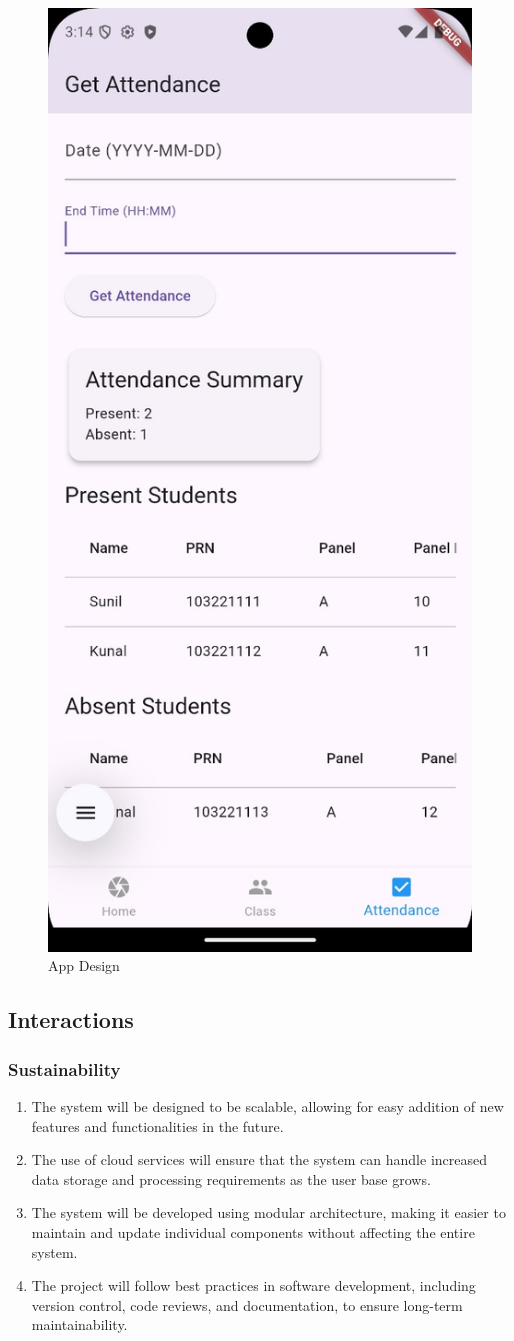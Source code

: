 \documentclass[openany]{report}
\begin{document}
\begin{figure}[H]
    \centering
    \includegraphics[width=.45\textwidth]{../imgs/app 3.jpg}
    \caption{App Design}
\end{figure}
\subsection{Interactions}
\subsubsection{Sustainability}
\begin{enumerate}
    \item The system will be designed to be scalable, allowing for easy addition of new features and functionalities in the future.
    \item The use of cloud services will ensure that the system can handle increased data storage and processing requirements as the user base grows.
    \item The system will be developed using modular architecture, making it easier to maintain and update individual components without affecting the entire system.
    \item The project will follow best practices in software development, including version control, code reviews, and documentation, to ensure long-term maintainability.
\end{enumerate}
\end{document}
